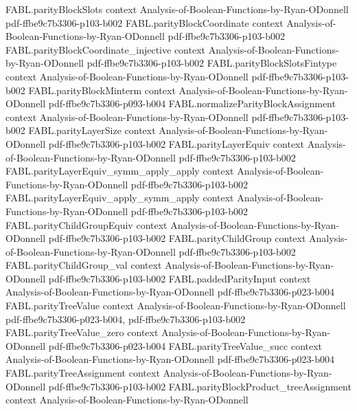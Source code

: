 \begin{theorem}
\proofstep
  {FABL.parityBlockSlots}
  {context}
  {Analysis-of-Boolean-Functions-by-Ryan-ODonnell}
  {pdf-ffbe9c7b3306-p103-b002}
\proofstep
  {FABL.parityBlockCoordinate}
  {context}
  {Analysis-of-Boolean-Functions-by-Ryan-ODonnell}
  {pdf-ffbe9c7b3306-p103-b002}
\proofstep
  {FABL.parityBlockCoordinate_injective}
  {context}
  {Analysis-of-Boolean-Functions-by-Ryan-ODonnell}
  {pdf-ffbe9c7b3306-p103-b002}
\proofstep
  {FABL.parityBlockSlotsFintype}
  {context}
  {Analysis-of-Boolean-Functions-by-Ryan-ODonnell}
  {pdf-ffbe9c7b3306-p103-b002}
\proofstep
  {FABL.parityBlockMinterm}
  {context}
  {Analysis-of-Boolean-Functions-by-Ryan-ODonnell}
  {pdf-ffbe9c7b3306-p093-b004}
\proofstep
  {FABL.normalizeParityBlockAssignment}
  {context}
  {Analysis-of-Boolean-Functions-by-Ryan-ODonnell}
  {pdf-ffbe9c7b3306-p103-b002}
\proofstep
  {FABL.parityLayerSize}
  {context}
  {Analysis-of-Boolean-Functions-by-Ryan-ODonnell}
  {pdf-ffbe9c7b3306-p103-b002}
\proofstep
  {FABL.parityLayerEquiv}
  {context}
  {Analysis-of-Boolean-Functions-by-Ryan-ODonnell}
  {pdf-ffbe9c7b3306-p103-b002}
\proofstep
  {FABL.parityLayerEquiv_symm_apply_apply}
  {context}
  {Analysis-of-Boolean-Functions-by-Ryan-ODonnell}
  {pdf-ffbe9c7b3306-p103-b002}
\proofstep
  {FABL.parityLayerEquiv_apply_symm_apply}
  {context}
  {Analysis-of-Boolean-Functions-by-Ryan-ODonnell}
  {pdf-ffbe9c7b3306-p103-b002}
\proofstep
  {FABL.parityChildGroupEquiv}
  {context}
  {Analysis-of-Boolean-Functions-by-Ryan-ODonnell}
  {pdf-ffbe9c7b3306-p103-b002}
\proofstep
  {FABL.parityChildGroup}
  {context}
  {Analysis-of-Boolean-Functions-by-Ryan-ODonnell}
  {pdf-ffbe9c7b3306-p103-b002}
\proofstep
  {FABL.parityChildGroup_val}
  {context}
  {Analysis-of-Boolean-Functions-by-Ryan-ODonnell}
  {pdf-ffbe9c7b3306-p103-b002}
\proofstep
  {FABL.paddedParityInput}
  {context}
  {Analysis-of-Boolean-Functions-by-Ryan-ODonnell}
  {pdf-ffbe9c7b3306-p023-b004}
\proofstep
  {FABL.parityTreeValue}
  {context}
  {Analysis-of-Boolean-Functions-by-Ryan-ODonnell}
  {pdf-ffbe9c7b3306-p023-b004,
    pdf-ffbe9c7b3306-p103-b002}
\proofstep
  {FABL.parityTreeValue_zero}
  {context}
  {Analysis-of-Boolean-Functions-by-Ryan-ODonnell}
  {pdf-ffbe9c7b3306-p023-b004}
\proofstep
  {FABL.parityTreeValue_succ}
  {context}
  {Analysis-of-Boolean-Functions-by-Ryan-ODonnell}
  {pdf-ffbe9c7b3306-p023-b004}
\proofstep
  {FABL.parityTreeAssignment}
  {context}
  {Analysis-of-Boolean-Functions-by-Ryan-ODonnell}
  {pdf-ffbe9c7b3306-p103-b002}
\proofstep
  {FABL.parityBlockProduct_treeAssignment}
  {context}
  {Analysis-of-Boolean-Functions-by-Ryan-ODonnell}

\end{theorem}
